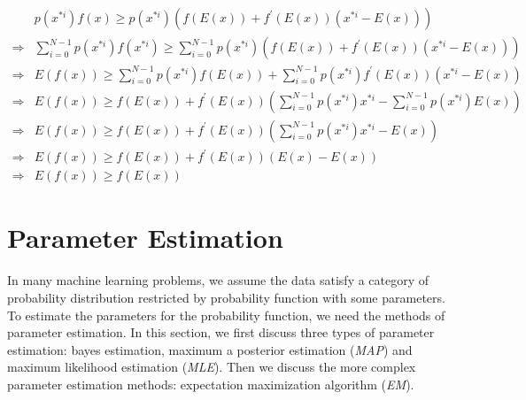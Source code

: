 \documentclass[runningheads,openany]{xhlPaper}
\begin{document}
\begin{equation}
\label{equ:jensenProof}
\begin{aligned}
&p\left( {{x^{*i}}} \right)f\left( x \right) \ge p\left( {{x^{*i}}} \right)\left( {f\left( {E\left( x \right)} \right) + {f^{'}}\left( {E\left( x \right)} \right)\left( {{x^{*i}} - E\left( x \right)} \right)} \right)\\
 \Rightarrow& \sum\limits_{i = 0}^{N - 1} {p\left( {{x^{*i}}} \right)f\left( {{x^{*i}}} \right)}  \ge \sum\limits_{i = 0}^{N - 1} {p\left( {{x^{*i}}} \right)\left( {f\left( {E\left( x \right)} \right) + {f^{'}}\left( {E\left( x \right)} \right)\left( {{x^{*i}} - E\left( x \right)} \right)} \right)} \\
 \Rightarrow& E\left( {f\left( x \right)} \right) \ge \sum\limits_{i = 0}^{N - 1} {p\left( {{x^{*i}}} \right)f\left( {E\left( x \right)} \right)}  + \sum\limits_{i = 0}^{N - 1} {p\left( {{x^{*i}}} \right){f^{'}}\left( {E\left( x \right)} \right)\left( {{x^{*i}} - E\left( x \right)} \right)} \\
 \Rightarrow& E\left( {f\left( x \right)} \right) \ge f\left( {E\left( x \right)} \right) + {f^{'}}\left( {E\left( x \right)} \right)\left( {\sum\limits_{i = 0}^{N - 1} {p\left( {{x^{*i}}} \right){x^{*i}}}  - \sum\limits_{i = 0}^{N - 1} {p\left( {{x^{*i}}} \right)E\left( x \right)} } \right)\\
 \Rightarrow& E\left( {f\left( x \right)} \right) \ge f\left( {E\left( x \right)} \right) + {f^{'}}\left( {E\left( x \right)} \right)\left( {\sum\limits_{i = 0}^{N - 1} {p\left( {{x^{*i}}} \right){x^{*i}}}  - E\left( x \right)} \right)\\
 \Rightarrow& E\left( {f\left( x \right)} \right) \ge f\left( {E\left( x \right)} \right) + {f^{'}}\left( {E\left( x \right)} \right)\left( {E\left( x \right) - E\left( x \right)} \right)\\
 \Rightarrow& E\left( {f\left( x \right)} \right) \ge f\left( {E\left( x \right)} \right)
\end{aligned}
\end{equation}




\section{Parameter Estimation}
\label{sec:parameter_estimation}
In many machine learning problems, we assume the data satisfy a category of probability distribution restricted by probability function with some parameters. To estimate the parameters for the probability function, we need the methods of parameter estimation. In this section, we first discuss three types of parameter estimation: bayes estimation, maximum a posterior estimation (\emph{MAP}) and maximum likelihood estimation (\emph{MLE}). Then we discuss the more complex parameter estimation methods: expectation maximization algorithm (\emph{EM}).
\end{document}
